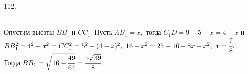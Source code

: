 112. \begin{figure}[ht!]
\end{figure}\\
Опустим высоты $BB_1$ и $CC_1.$ Пусть $AB_1=x,$ тогда $C_1D=9-5-x=4-x$ и $BB_1^2=4^2-x^2=CC_1^2=5^2-(4-x)^2,\ 16-x^2=25-16+8x-x^2,\ x=\cfrac{7}{8}.$ Тогда $BB_1=\sqrt{16-\cfrac{49}{64}}=\cfrac{5\sqrt{39}}{8}.$\\
